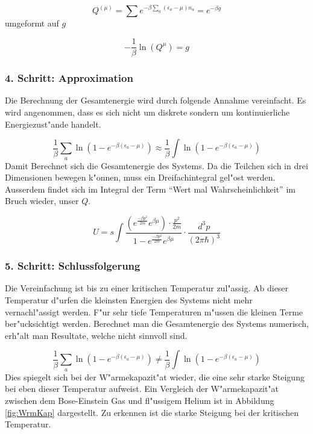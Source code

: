 \begin{refsection}
\begin{equation}
Q^{(\mu)} = \sum e^{- \beta \sum_{a} (\epsilon_a - \mu)n_a} = e^{-\beta g}
\end{equation}
umgeformt auf $g$

\begin{equation}
-\frac{1}{ \beta } \ln(Q^{\mu}) = g
\end{equation}
  
\subsubsection{4. Schritt: Approximation}
  
Die Berechnung der Gesamtenergie wird durch folgende Annahme vereinfacht. 
Es wird angenommen, dass es sich nicht um diskrete sondern um kontinuierliche Energiezust"ande handelt.

\begin{equation}
\frac{1}{\beta} \sum_{a} \ln(1-e^{-\beta (\epsilon_a -\mu)}) \approx \frac{1}{\beta} \int \ln(1-e^{-\beta (\epsilon_a-\mu)})
\end{equation}
Damit Berechnet sich die Gesamtenergie des Systems.
Da die Teilchen sich in drei Dimensionen bewegen k"onnen, muss ein Dreifachintegral gel"ost werden.
Ausserdem findet sich im Integral der Term ``Wert mal Wahrscheinlichkeit'' im Bruch wieder, unser $Q$.

\begin{equation}
U = s \int  \frac{ \left(e^{ {\frac{- \beta p^2}{2m}} } e^{\beta \mu} \right) \cdot {\frac{p^2}{2m}} }{1-e^{ {\frac{- \beta p^2}{2m}} } e^{\beta \mu}} \cdot \frac{d^3 p}{(2 \pi \hbar)^3}
\end{equation}

\subsubsection{5. Schritt: Schlussfolgerung}

Die Vereinfachung ist bis zu einer kritischen Temperatur zul"assig. Ab dieser Temperatur d"urfen die kleinsten Energien des Systems nicht mehr vernachl"assigt werden. F"ur sehr tiefe Temperaturen m"ussen die kleinen Terme ber"ucksichtigt werden. Berechnet man die Gesamtenergie des Systems numerisch, erh"alt man Resultate, welche nicht sinnvoll sind.

\begin{equation}
\frac{1}{\beta} \sum_{a} \ln(1-e^{-\beta (\epsilon_a-\mu)}) \neq \frac{1}{\beta} \int \ln(1-e^{-\beta (\epsilon_a-\mu)})
\end{equation}
Dies spiegelt sich bei der W"armekapazit"at wieder, die eine sehr starke Steigung bei eben dieser Temperatur aufweist. Ein Vergleich der W"armekapazit"at zwischen dem Bose-Einstein Gas und fl"ussigem Helium ist in Abbildung \ref{fig:WrmKap} dargestellt. Zu erkennen ist die starke Steigung bei der kritischen Temperatur.


\end{refsection}
